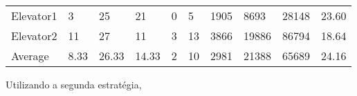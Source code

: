 \documentclass[a4paper]{article}
\begin{document}
\begin{table}[h]
\begin{tabular}{@{}llllllllll@{}}
Elevator1 & 3        & 25            & 21           & 0                                                               & 5                                                                  & 1905                                                         & 8693                                                 & 28148                                                   & 23.60        \\
Elevator2 & 11        & 27            & 11           & 3                                                               & 13                                                                  & 3866                                                         & 19886                                                 & 86794                                                   & 18.64         \\
Average   & 8.33     & 26.33         & 14.33        & 2                                                               & 10                                                               & 2981                                                         & 21388                                                 & 65689                                                   & 24.16          \\ \bottomrule
\end{tabular}
\end{table}

Utilizando a segunda estratégia,
\end{document}
